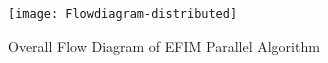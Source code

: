 \documentclass[11pt,openright]{report}
\begin{document}
\begin{figure}
	\centering
	\texttt{[image: Flowdiagram-distributed]}
	\caption{Overall Flow Diagram of EFIM Parallel Algorithm}
	\label{fig:flowdiagram_efimpar}
\end{figure}

%
%
%
%
%
%
%
%
%
%
%
%
\end{document}
